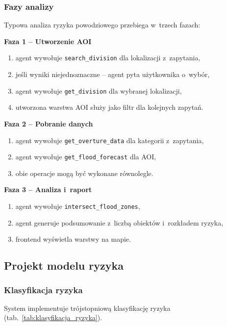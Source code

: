 \subsubsection{Fazy analizy}

Typowa analiza ryzyka powodziowego przebiega w~trzech fazach:

\textbf{Faza 1 -- Utworzenie AOI}
\begin{enumerate}
    \item agent wywołuje \texttt{search\_division} dla lokalizacji z~zapytania,
    \item jeśli wyniki niejednoznaczne -- agent pyta użytkownika o~wybór,
    \item agent wywołuje \texttt{get\_division} dla wybranej lokalizacji,
    \item utworzona warstwa AOI służy jako filtr dla kolejnych zapytań.
\end{enumerate}

\textbf{Faza 2 -- Pobranie danych}
\begin{enumerate}
    \item agent wywołuje \texttt{get\_overture\_data} dla kategorii z~zapytania,
    \item agent wywołuje \texttt{get\_flood\_forecast} dla AOI,
    \item obie operacje mogą być wykonane równolegle.
\end{enumerate}

\textbf{Faza 3 -- Analiza i~raport}
\begin{enumerate}
    \item agent wywołuje \texttt{intersect\_flood\_zones},
    \item agent generuje podsumowanie z~liczbą obiektów i~rozkładem ryzyka,
    \item frontend wyświetla warstwy na mapie.
\end{enumerate}

\subsection{Projekt modelu ryzyka}

\subsubsection{Klasyfikacja ryzyka}

System implementuje trójstopniową klasyfikację ryzyka (tab.~\ref{tab:klasyfikacja_ryzyka}).

